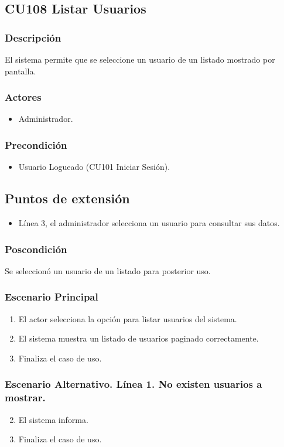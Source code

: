 \subsection{CU108 Listar Usuarios}
\subsubsection{Descripci\'{o}n}
El sistema permite que se seleccione un usuario de un listado mostrado por pantalla.
\subsubsection{Actores}
\begin{itemize}
\item Administrador.
\end{itemize}
\subsubsection{Precondici\'{o}n}
\begin{itemize}
\item Usuario Logueado (CU101 Iniciar Sesi\'{o}n).
\end{itemize}
\subsection{Puntos de extensi\'{o}n}
\begin{itemize}
\item L\'{i}nea 3, el administrador selecciona un usuario para consultar sus datos.
\end{itemize}
\subsubsection{Poscondici\'{o}n}
Se seleccion\'{o} un usuario de un listado para posterior uso.
\subsubsection{Escenario Principal}
\begin{enumerate}
\item El actor selecciona la opci\'{o}n para listar usuarios del sistema.
\item El sistema muestra un listado de usuarios paginado correctamente.
\item Finaliza el caso de uso.
\end{enumerate}
\subsubsection{Escenario Alternativo. L\'{i}nea 1. No existen usuarios a mostrar.}
\begin{enumerate}
\setcounter{enumi}{1}
\item El sistema informa.
\item Finaliza el caso de uso.
\end{enumerate}